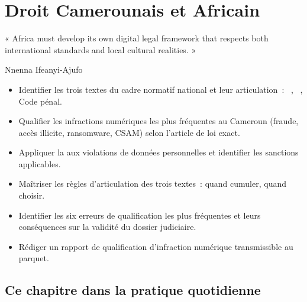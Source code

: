 
\chapter{Droit Camerounais et Africain}
\label{chap:droit-cam}

\epigraph{%
    « Africa must develop its own digital legal framework that respects
    both international standards and local cultural realities. »%
}{Nnenna Ifeanyi-Ajufo}


\begin{boxobjectifs}
\begin{itemize}
    \item Identifier les trois textes du cadre normatif national et
          leur articulation~: ~\cite{cameroun2010a}, ~\cite{cameroun2024donnees},
          Code pénal.
    \item Qualifier les infractions numériques les plus fréquentes
          au Cameroun (fraude, accès illicite, ransomware, CSAM) selon
          l'article de loi exact.
    \item Appliquer la  aux violations de données
          personnelles et identifier les sanctions applicables.
    \item Maîtriser les règles d'articulation des trois textes~:
          quand cumuler, quand choisir.
    \item Identifier les six erreurs de qualification les plus fréquentes
          et leurs conséquences sur la validité du dossier judiciaire.
    \item Rédiger un rapport de qualification d'infraction numérique
          transmissible au parquet.
\end{itemize}
\end{boxobjectifs}

\bigskip

\section*{Ce chapitre dans la pratique quotidienne}


